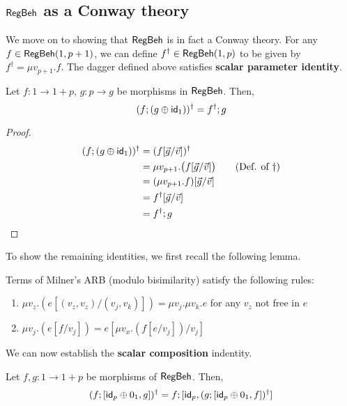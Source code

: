 \subsection{$\mathsf{RegBeh}$ as a Conway theory}
We move on to showing that $\mathsf{RegBeh}$ is in fact a Conway theory. For any $f \in \mathsf{RegBeh}(1, p + 1)$, we can define $f^\dagger \in \mathsf{RegBeh}(1,p)$ to be given by $f^\dagger = \mu v_{p+1}.f$.
The dagger defined above satisfies \textbf{scalar parameter identity}.
\begin{lemma}\label{conway1}
	Let $f \colon 1 \to 1 + p$, $g \colon p \to g$ be morphisms in $\mathsf{RegBeh}$. Then,
	$$
	(f ; (g\oplus \mathsf{id}_1))^\dagger = f^\dagger ; g
	$$
\end{lemma}
\begin{proof}
\begin{align*}
(f ; (g \oplus \mathsf{id}_1))^\dagger & = (f[\vec{g}/\vec{v}])^\dagger
\\
& = \mu v_{p+1}.\big(f[\vec{g}/\vec{v}]\big) \tag{Def. of $\dagger$}
\\
& = (\mu v_{p+1}.f)[\vec{g}/\vec{v}] 
\\
& = f^\dagger[\vec{g}/\vec{v}] 
\\
& = f^\dagger ; g
\end{align*}
\end{proof}
To show the remaining identities, we first recall the following lemma.
 \begin{lemma}
\label{lem:recursion-substitution}
Terms of Milner's ARB (modulo bisimilarity) satisfy the following rules:
	\begin{enumerate}
		\item $\mu v_z. \left(e [(v_z, v_z) / (v_j, v_k)]\right) = \mu v_j. \mu v_k. e$ for any $v_z$ not free in $e$
		\item $ \mu v_j.\left(e[f/v_j]\right) = e[\mu v_x. \left(f[e/v_j]\right)/v_j]$
	\end{enumerate}
\end{lemma}
We can now establish the \textbf{scalar composition} indentity.
\begin{lemma}\label{conway2}
Let $f,g \colon 1 \to 1 + p$ be morphisms of $\mathsf{RegBeh}$. Then,
		$$
		(f ; [  \mathsf{id}_p \oplus 0_1 , g ])^\dagger = f ; [ \mathsf{id}_p, (g ;  [  \mathsf{id}_p \oplus 0_1 , f])^\dagger]
		$$ 
\end{lemma}

